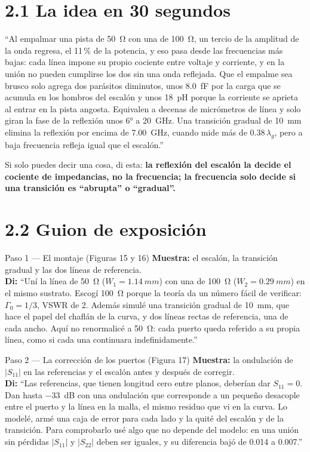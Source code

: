 \documentclass[11pt,letterpaper]{article}
\begin{document}
\section*{2.1 La idea en 30 segundos}
\begin{idea}
``Al empalmar una pista de \SI{50}{\ohm} con una de \SI{100}{\ohm}, un tercio de la amplitud de la onda regresa, el 11\,\% de la potencia, y eso pasa desde las frecuencias más bajas: cada línea impone su propio cociente entre voltaje y corriente, y en la unión no pueden cumplirse los dos sin una onda reflejada. Que el empalme sea brusco solo agrega dos parásitos diminutos, unos \SI{8.0}{fF} por la carga que se acumula en los hombros del escalón y unos \SI{18}{pH} porque la corriente se aprieta al entrar en la pista angosta. Equivalen a decenas de micrómetros de línea y solo giran la fase de la reflexión unos \ang{6} a \SI{20}{GHz}. Una transición gradual de \SI{10}{mm} elimina la reflexión por encima de \SI{7.00}{GHz}, cuando mide más de $0.38\,\lambda_g$, pero a baja frecuencia refleja igual que el escalón.''
\end{idea}

Si solo puedes decir una cosa, di esta: \textbf{la reflexión del escalón la decide el cociente de impedancias, no la frecuencia; la frecuencia solo decide si una transición es ``abrupta'' o ``gradual''.}

\section*{2.2 Guion de exposición}

\begin{paso}{Paso 1 --- El montaje (Figuras 15 y 16)}
\textbf{Muestra:} el escalón, la transición gradual y las dos líneas de referencia.\\
\textbf{Di:} ``Uní la línea de \SI{50}{\ohm} ($W_1=\SI{1.14}{mm}$) con una de \SI{100}{\ohm} ($W_2=\SI{0.29}{mm}$) en el mismo sustrato. Escogí \SI{100}{\ohm} porque la teoría da un número fácil de verificar: $\Gamma_0=1/3$, VSWR de 2. Además simulé una transición gradual de \SI{10}{mm}, que hace el papel del chaflán de la curva, y dos líneas rectas de referencia, una de cada ancho. Aquí no renormalicé a \SI{50}{\ohm}: cada puerto queda referido a su propia línea, como si cada una continuara indefinidamente.''
\end{paso}

\begin{paso}{Paso 2 --- La corrección de los puertos (Figura 17)}
\textbf{Muestra:} la ondulación de $|S_{11}|$ en las referencias y el escalón antes y después de corregir.\\
\textbf{Di:} ``Las referencias, que tienen longitud cero entre planos, deberían dar $S_{11}=0$. Dan hasta \SI{-33}{dB} con una ondulación que corresponde a un pequeño desacople entre el puerto y la línea en la malla, el mismo residuo que vi en la curva. Lo modelé, armé una caja de error para cada lado y la quité del escalón y de la transición. Para comprobarlo usé algo que no depende del modelo: en una unión sin pérdidas $|S_{11}|$ y $|S_{22}|$ deben ser iguales, y su diferencia bajó de 0.014 a 0.007.''
\end{paso}
\end{document}

